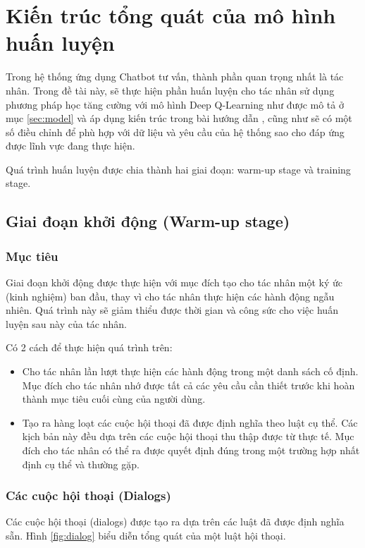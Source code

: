 \section{Kiến trúc tổng quát của mô hình huấn luyện}
\label{sec:trainingmodel}
Trong hệ thống ứng dụng Chatbot tư vấn, thành phần quan trọng nhất là tác nhân. Trong đề tài này, sẽ thực hiện phần huấn luyện cho tác nhân sử dụng phương pháp học tăng cường với mô hình Deep Q-Learning như được mô tả ở mục \ref{sec:model} và áp dụng kiến trúc trong bài hướng dẫn \cite{traininggochatbot}, cũng như sẽ có một số điều chỉnh để phù hợp với dữ liệu và yêu cầu của hệ thống sao cho đáp ứng được lĩnh vực đang thực hiện.

Quá trình huấn luyện được chia thành hai giai đoạn: warm-up stage và training stage.

\subsection{Giai đoạn khởi động (Warm-up stage)}
\subsubsection{Mục tiêu}
Giai đoạn khởi động được thực hiện với mục đích tạo cho tác nhân một ký ức (kinh nghiệm) ban đầu, thay vì cho tác nhân thực hiện các hành động ngẫu nhiên. Quá trình này sẽ giảm thiểu được thời gian và công sức cho việc huấn luyện sau này của tác nhân.

Có 2 cách để thực hiện quá trình trên:
\begin{itemize}
    \item Cho tác nhân lần lượt thực hiện các hành động trong một danh sách cố định. Mục đích cho tác nhân nhớ được tất cả các yêu cầu cần thiết trước khi hoàn thành mục tiêu cuối cùng của người dùng.
    \item Tạo ra hàng loạt các cuộc hội thoại đã được định nghĩa theo luật cụ thể. Các kịch bản này đều dựa trên các cuộc hội thoại thu thập được từ thực tế. Mục đích cho tác nhân có thể ra được quyết định đúng trong một trường hợp nhất định cụ thể và thường gặp.
\end{itemize}

\subsubsection{Các cuộc hội thoại (Dialogs)}
\label{subsubsec:dialog}
Các cuộc hội thoại (dialogs) được tạo ra dựa trên các luật đã được định nghĩa sẵn. Hình \ref{fig:dialog} biểu diễn tổng quát của một luật hội thoại.


